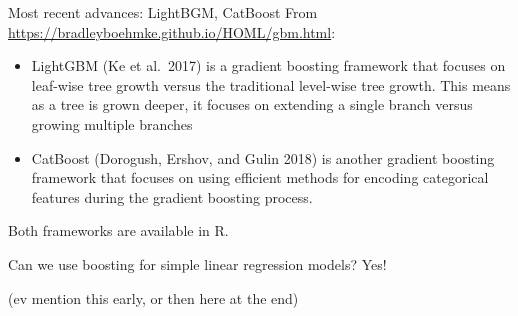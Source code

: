 \documentclass[
  10pt,
  ignorenonframetext,
]{beamer}
\begin{document}
\begin{frame}{Most recent advances: LightBGM, CatBoost}
\protect\hypertarget{most-recent-advances-lightbgm-catboost}{}
From \url{https://bradleyboehmke.github.io/HOML/gbm.html}:

\begin{itemize}
\item
  LightGBM (Ke et al.~2017) is a gradient boosting framework that
  focuses on leaf-wise tree growth versus the traditional level-wise
  tree growth. This means as a tree is grown deeper, it focuses on
  extending a single branch versus growing multiple branches
\item
  CatBoost (Dorogush, Ershov, and Gulin 2018) is another gradient
  boosting framework that focuses on using efficient methods for
  encoding categorical features during the gradient boosting process.
\end{itemize}

Both frameworks are available in R.
\end{frame}

\begin{frame}{Can we use boosting for simple linear regression models?}
\protect\hypertarget{can-we-use-boosting-for-simple-linear-regression-models}{}
Yes!

(ev mention this early, or then here at the end)
\end{frame}
\end{document}

